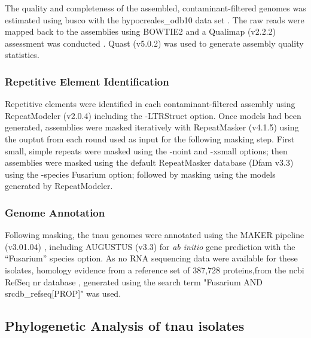 The quality and completeness of the assembled, contaminant-filtered genomes was estimated using \ac{busco} with the hypocreales\_odb10 data set \parencite{Manni2021}. The raw reads were mapped back to the assemblies using BOWTIE2 and a Qualimap (v2.2.2) assessment was conducted \parencite{Garcia-Alcalde2012}. Quast (v5.0.2) \parencite{Gurevich2013} was used to generate assembly quality statistics. 

\subsubsection{Repetitive Element Identification}

Repetitive elements were identified in each contaminant-filtered assembly using RepeatModeler (v2.0.4) \parencite{Flynn2020} including the -LTRStruct option. Once models had been generated, assemblies were masked iteratively with RepeatMasker (v4.1.5) \parencite{Smit2010} using the ouptut from each round used as input for the following masking step. First small, simple repeats were masked using the -noint and -xsmall options; then assemblies were masked using the default RepeatMasker database (Dfam v3.3) \parencite{Storer2021} using the -species Fusarium option; followed by masking using the models generated by RepeatModeler.

\subsubsection{Genome Annotation}
Following masking, the \ac{tnau} genomes were annotated using the MAKER pipeline (v3.01.04) \parencite{Holt2011}, including AUGUSTUS (v3.3) \parencite{Stanke2006} for \textit{ab initio} gene prediction with the “Fusarium” species option. As no RNA sequencing data were available for these isolates, homology evidence from a reference set of 387,728 proteins,from the \ac{ncbi} RefSeq nr database \parencite{Agarwala2016}, generated using the search term "Fusarium AND srcdb\_refseq[PROP]" was used. 

\subsection{Phylogenetic Analysis of \ac{tnau} isolates}\label{chap2:phylogeny}

